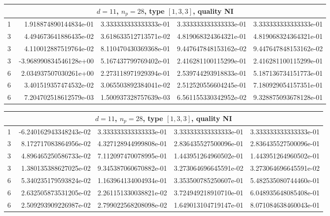 \documentclass{article}
\begin{document}
\begin{center}
\begin{tabular}{rrrrr}
\multicolumn{5}{c}{\rmfamily $d=11$, $n_p=28$, type $[1,3,3]$, quality NI}\\
\toprule
1 & ~1.918874890144834e-01 & 3.333333333333333e-01 & 3.333333333333333e-01 & 3.333333333333333e-01\\
3 & ~4.494673641886435e-02 & 3.618633512713571e-02 & 4.819068324364321e-01 & 4.819068324364321e-01\\
3 & ~4.110012887519764e-02 & 8.110470430369368e-01 & 9.447647848153162e-02 & 9.447647848153162e-02\\
3 & -3.968990834546128e+00 & 5.167437799769402e-01 & 2.416281100115299e-01 & 2.416281100115299e-01\\
6 & ~2.034937507030261e+00 & 2.273118971929394e-01 & 2.539744293918833e-01 & 5.187136734151773e-01\\
6 & ~3.401519357474532e-02 & 3.065503892384041e-02 & 2.512520556604245e-01 & 7.180929054157351e-01\\
6 & ~7.204702518612579e-03 & 1.500937328757639e-03 & 6.561155330342952e-02 & 9.328875093678128e-01\\
\bottomrule
\end{tabular}
\bigskip

\begin{tabular}{rrrrr}
\multicolumn{5}{c}{\rmfamily $d=11$, $n_p=28$, type $[1,3,3]$, quality NI}\\
\toprule
1 & -6.240162943348243e-02 & 3.333333333333333e-01 & 3.333333333333333e-01 & 3.333333333333333e-01\\
3 & ~8.172717083864956e-02 & 4.327128944999808e-01 & 2.836435527500096e-01 & 2.836435527500096e-01\\
3 & ~4.896465250586733e-02 & 7.112097470078995e-01 & 1.443951264960502e-01 & 1.443951264960502e-01\\
3 & ~1.380135388627025e-02 & 9.345387060670882e-01 & 3.273064696645591e-02 & 3.273064696645591e-02\\
6 & ~5.340235179593824e-02 & 1.163964134004934e-01 & 3.353500785250607e-01 & 5.482535080744460e-01\\
6 & ~2.632505873531205e-02 & 2.261151330038821e-02 & 3.724949218910710e-01 & 6.048935648085408e-01\\
6 & ~2.509293909226987e-02 & 2.799022568208098e-02 & 1.649013104719147e-01 & 8.071084638460043e-01\\
\bottomrule
\end{tabular}
\bigskip


\end{center}
\end{document}
